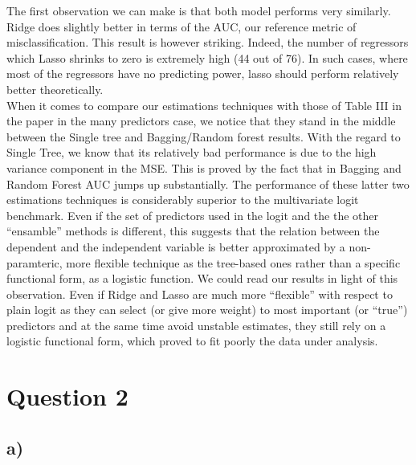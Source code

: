 \documentclass[
]{article}
\begin{document}
The first observation we can make is that both model performs very
similarly. Ridge does slightly better in terms of the AUC, our reference
metric of misclassification. This result is however striking. Indeed,
the number of regressors which Lasso shrinks to zero is extremely high
(44 out of 76). In such cases, where most of the regressors have no
predicting power, lasso should perform relatively better
theoretically.\\
When it comes to compare our estimations techniques with those of Table
III in the paper in the many predictors case, we notice that they stand
in the middle between the Single tree and Bagging/Random forest results.
With the regard to Single Tree, we know that its relatively bad
performance is due to the high variance component in the MSE. This is
proved by the fact that in Bagging and Random Forest AUC jumps up
substantially. The performance of these latter two estimations
techniques is considerably superior to the multivariate logit benchmark.
Even if the set of predictors used in the logit and the the other
``ensamble'' methods is different, this suggests that the relation
between the dependent and the independent variable is better
approximated by a non-paramteric, more flexible technique as the
tree-based ones rather than a specific functional form, as a logistic
function. We could read our results in light of this observation. Even
if Ridge and Lasso are much more ``flexible'' with respect to plain
logit as they can select (or give more weight) to most important (or
``true'') predictors and at the same time avoid unstable estimates, they
still rely on a logistic functional form, which proved to fit poorly the
data under analysis.

\hypertarget{question-2}{%
\section{Question 2}\label{question-2}}

\hypertarget{a}{%
\subsection{a)}\label{a}}
\end{document}
